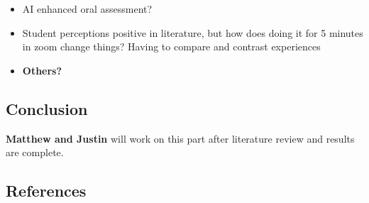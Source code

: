 \documentclass[
  letterpaper,
  DIV=11,
  numbers=noendperiod]{scrartcl}
\providecommand{\tightlist}{%
  \setlength{\itemsep}{0pt}\setlength{\parskip}{0pt}}\usepackage{longtable,booktabs,array}
\begin{document}
\begin{itemize}
\tightlist
\item
  AI enhanced oral assessment?
\item
  Student perceptions positive in literature, but how does doing it for
  5 minutes in zoom change things? Having to compare and contrast
  experiences
\item
  \textbf{Others?}
\end{itemize}

\hypertarget{conclusion}{%
\subsection{Conclusion}\label{conclusion}}

\textbf{Matthew and Justin} will work on this part after literature
review and results are complete.

\hypertarget{references}{%
\subsection*{References}\label{references}}
\end{document}
